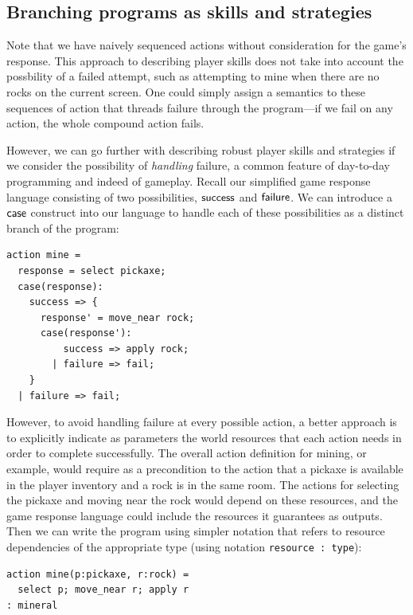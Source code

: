 \subsection{Branching programs as skills and strategies}

Note that we have naively sequenced actions without consideration for the
game's response. This approach to describing player skills does not take
into account the possbility of a failed attempt, such as attempting to mine
when there are no rocks on the current screen. One could simply assign a
semantics to these sequences of action that threads failure through the
program---if we fail on any action, the whole compound action fails.

However, we can go further with describing robust player skills and
strategies if we consider the possibility of {\em handling} failure, a
common feature of day-to-day programming and indeed of gameplay. Recall our
simplified game response language consisting of two possibilities,
$\mathsf{success}$ and $\mathsf{failure}$. We can introduce a $\mathsf{case}$
construct into our language to handle each of these possibilities as a
distinct branch of the program:
%
\begin{verbatim}
action mine = 
  response = select pickaxe;
  case(response):
    success => {
      response' = move_near rock;
      case(response'):
          success => apply rock;
        | failure => fail;
    }
  | failure => fail;
\end{verbatim}
%
However, to avoid handling failure at every possible action, a better
approach is to explicitly indicate as parameters the world resources that
each action needs in order to complete successfully.
The overall action definition for mining, or example, would
require as a precondition to the action that a pickaxe is
available in the player inventory and a rock is in the same room. The
actions for selecting the pickaxe and moving near the rock would depend on
these resources, and the game response language could include the resources
it guarantees as outputs. Then we can write the program using simpler
notation that refers to resource dependencies of the appropriate type
(using notation \verb|resource : type|):
%
\begin{verbatim}
action mine(p:pickaxe, r:rock) = 
  select p; move_near r; apply r
: mineral
\end{verbatim}
%

